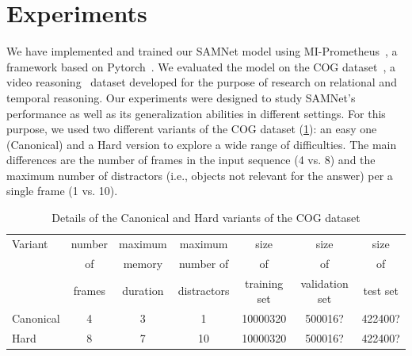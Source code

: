\section{Experiments}

We have implemented and trained our SAMNet model using MI-Prometheus~\cite{kornuta2018accelerating}, a framework based on Pytorch~\cite{paszke2017automatic}. 
We evaluated the model on the COG dataset~\cite{yang2018dataset}, a video reasoning~\cite{mogadala2019trends} dataset developed for the purpose of research on relational and temporal reasoning.
Our experiments were designed to study SAMNet's performance as well as its generalization abilities in different settings.
For this purpose, we used two different variants of the COG dataset (\cref{tab:cog_variants}): an easy one (Canonical) and a Hard version to explore a wide range of difficulties.
The main differences are the number of frames in the input sequence (4 vs. 8) and the maximum number of distractors (i.e., objects not relevant for the answer) per a single frame (1 vs. 10).


\begin{table}[htb]
\caption{Details of the Canonical and Hard variants of the COG dataset}
\centering
\begin{tabular}{lcccccc}
	\toprule
	Variant    &  	number &  	maximum & maximum & size & size & size  \\ 
	& of   & memory & number of & of & of & of  \\
	& frames & duration & distractors & training set & validation set & test set \\
	\midrule
	Canonical & 4 & 3 & 1 & 10000320 & 500016? & 422400? \\	
	Hard  & 8 & 7 & 10 & 10000320 & 500016?  & 422400? \\
	\bottomrule	
\end{tabular}
\label{tab:cog_variants}
\end{table}




%
%

